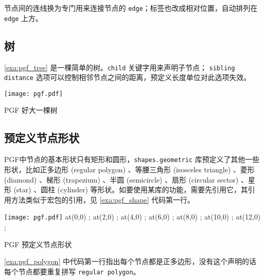 节点间的连线换为专门用来连接节点的 \texttt{edge}；标签也改成相对位置，自动排列在 \texttt{edge} 上方。

\subsection{树}

\autoref{exa:pgf_tree} 是一棵简单的树。\texttt{child} 关键字用来声明子节点； \texttt{sibling distance} 选项可以控制相邻节点之间的距离，预定义长度单位对此选项失效。

\begin{example}[h]
\begin{FBTDemo}[numbers=left]{\texttt{[image: pgf.pdf]}}
\end{FBTDemo}
\caption{PGF 好大一棵树}
\label{exa:pgf_tree}
\end{example}

\subsection{预定义节点形状}

PGF中节点的基本形状只有矩形和圆形，\texttt{shapes.geometric} 库预定义了其他一些形状，比如正多边形 (regular polygon) 、等腰三角形 (isosceles triangle) 、菱形 (diamond) 、梯形 (trapezium) 、半圆 (semicircle) 、扇形 (circular sector) 、星形 (star) 、圆柱 (cylinder) 等形状。如要使用某库的功能，需要先引用它，其引用方法类似于宏包的引用，见 \autoref{exa:pgf_shape} 代码第一行。

\begin{example}[h]
\begin{FBTDemo}[numbers=left]{\texttt{[image: pgf.pdf]}}
\usetikzlibrary{shapes.geometric}
 at(0,0) {};
 at(2,0) {};
 at(4,0) {};
 at(6,0) {};
 at(8,0) {};
 at(10,0) {};
 at(12,0) {};
\end{FBTDemo}
\caption{PGF 预定义节点形状}
\label{exa:pgf_shape}
\end{example}

\autoref{exa:pgf_polygon} 中代码第一行指出每个节点都是正多边形，没有这个声明的话每个节点都要重复拼写 \texttt{regular polygon}。

